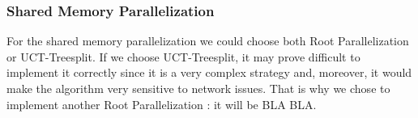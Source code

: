 \subsubsection{Shared Memory Parallelization}
For the shared memory parallelization we could choose both Root Parallelization or UCT-Treesplit.
If we choose UCT-Treesplit, it may prove difficult to implement it correctly since it is a very complex strategy and, moreover, it would make the algorithm very sensitive to network issues. That is why we chose to implement another Root Parallelization : it will be BLA BLA.
